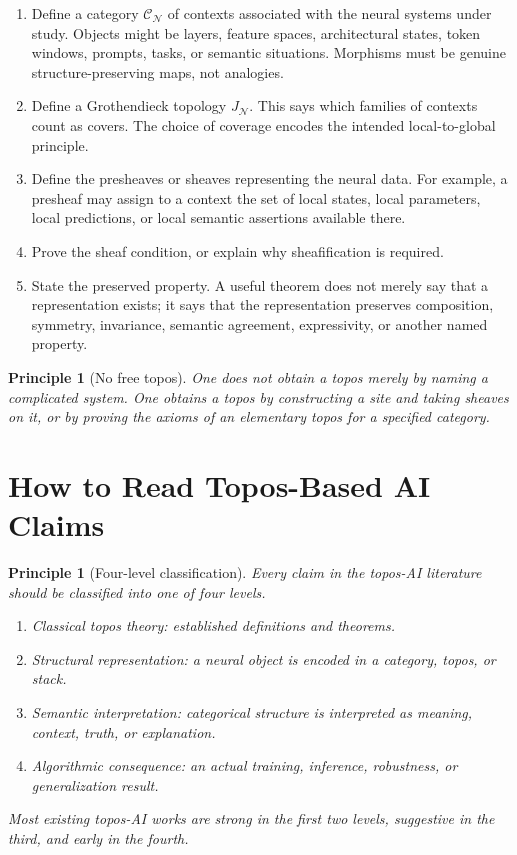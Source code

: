 \documentclass[11pt]{article}
\newtheorem{principle}[definition]{Principle}
\begin{document}
\begin{enumerate}
\item Define a category \(\mathcal C_{\mathcal N}\) of contexts associated with
the neural systems under study. Objects might be layers, feature spaces,
architectural states, token windows, prompts, tasks, or semantic situations.
Morphisms must be genuine structure-preserving maps, not analogies.
\item Define a Grothendieck topology \(J_{\mathcal N}\). This says which
families of contexts count as covers. The choice of coverage encodes the
intended local-to-global principle.
\item Define the presheaves or sheaves representing the neural data. For
example, a presheaf may assign to a context the set of local states, local
parameters, local predictions, or local semantic assertions available there.
\item Prove the sheaf condition, or explain why sheafification is required.
\item State the preserved property. A useful theorem does not merely say that a
representation exists; it says that the representation preserves composition,
symmetry, invariance, semantic agreement, expressivity, or another named
property.
\end{enumerate}

\begin{principle}[No free topos]
One does not obtain a topos merely by naming a complicated system. One obtains a
topos by constructing a site and taking sheaves on it, or by proving the axioms
of an elementary topos for a specified category.
\end{principle}

\section{How to Read Topos-Based AI Claims}

\begin{principle}[Four-level classification]
Every claim in the topos-AI literature should be classified into one of four
levels.
\begin{enumerate}
\item Classical topos theory: established definitions and theorems.
\item Structural representation: a neural object is encoded in a category,
topos, or stack.
\item Semantic interpretation: categorical structure is interpreted as meaning,
context, truth, or explanation.
\item Algorithmic consequence: an actual training, inference, robustness, or
generalization result.
\end{enumerate}
Most existing topos-AI works are strong in the first two levels, suggestive in
the third, and early in the fourth.
\end{principle}
\end{document}
